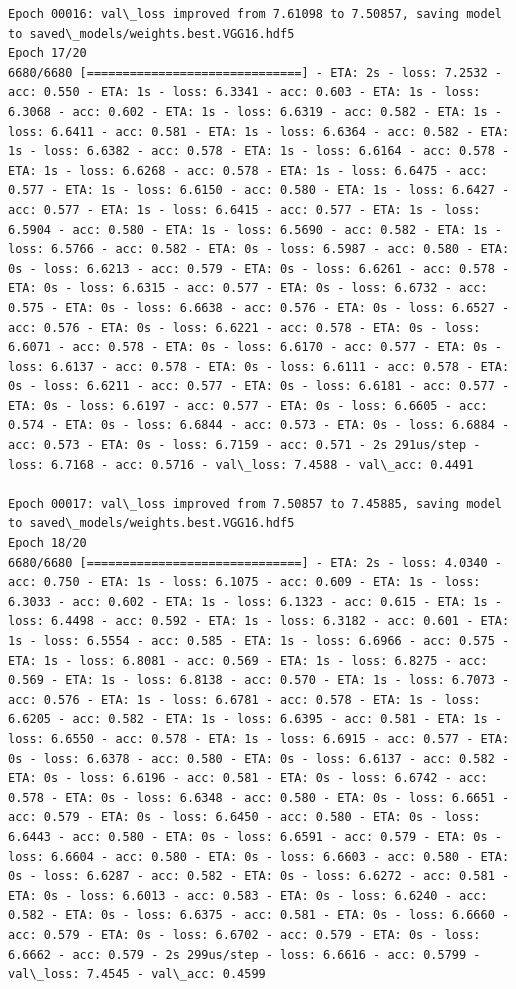 \documentclass[11pt]{article}
\begin{document}
\begin{Verbatim}[commandchars=\\\{\}]
Epoch 00016: val\_loss improved from 7.61098 to 7.50857, saving model to saved\_models/weights.best.VGG16.hdf5
Epoch 17/20
6680/6680 [==============================] - ETA: 2s - loss: 7.2532 - acc: 0.550 - ETA: 1s - loss: 6.3341 - acc: 0.603 - ETA: 1s - loss: 6.3068 - acc: 0.602 - ETA: 1s - loss: 6.6319 - acc: 0.582 - ETA: 1s - loss: 6.6411 - acc: 0.581 - ETA: 1s - loss: 6.6364 - acc: 0.582 - ETA: 1s - loss: 6.6382 - acc: 0.578 - ETA: 1s - loss: 6.6164 - acc: 0.578 - ETA: 1s - loss: 6.6268 - acc: 0.578 - ETA: 1s - loss: 6.6475 - acc: 0.577 - ETA: 1s - loss: 6.6150 - acc: 0.580 - ETA: 1s - loss: 6.6427 - acc: 0.577 - ETA: 1s - loss: 6.6415 - acc: 0.577 - ETA: 1s - loss: 6.5904 - acc: 0.580 - ETA: 1s - loss: 6.5690 - acc: 0.582 - ETA: 1s - loss: 6.5766 - acc: 0.582 - ETA: 0s - loss: 6.5987 - acc: 0.580 - ETA: 0s - loss: 6.6213 - acc: 0.579 - ETA: 0s - loss: 6.6261 - acc: 0.578 - ETA: 0s - loss: 6.6315 - acc: 0.577 - ETA: 0s - loss: 6.6732 - acc: 0.575 - ETA: 0s - loss: 6.6638 - acc: 0.576 - ETA: 0s - loss: 6.6527 - acc: 0.576 - ETA: 0s - loss: 6.6221 - acc: 0.578 - ETA: 0s - loss: 6.6071 - acc: 0.578 - ETA: 0s - loss: 6.6170 - acc: 0.577 - ETA: 0s - loss: 6.6137 - acc: 0.578 - ETA: 0s - loss: 6.6111 - acc: 0.578 - ETA: 0s - loss: 6.6211 - acc: 0.577 - ETA: 0s - loss: 6.6181 - acc: 0.577 - ETA: 0s - loss: 6.6197 - acc: 0.577 - ETA: 0s - loss: 6.6605 - acc: 0.574 - ETA: 0s - loss: 6.6844 - acc: 0.573 - ETA: 0s - loss: 6.6884 - acc: 0.573 - ETA: 0s - loss: 6.7159 - acc: 0.571 - 2s 291us/step - loss: 6.7168 - acc: 0.5716 - val\_loss: 7.4588 - val\_acc: 0.4491

Epoch 00017: val\_loss improved from 7.50857 to 7.45885, saving model to saved\_models/weights.best.VGG16.hdf5
Epoch 18/20
6680/6680 [==============================] - ETA: 2s - loss: 4.0340 - acc: 0.750 - ETA: 1s - loss: 6.1075 - acc: 0.609 - ETA: 1s - loss: 6.3033 - acc: 0.602 - ETA: 1s - loss: 6.1323 - acc: 0.615 - ETA: 1s - loss: 6.4498 - acc: 0.592 - ETA: 1s - loss: 6.3182 - acc: 0.601 - ETA: 1s - loss: 6.5554 - acc: 0.585 - ETA: 1s - loss: 6.6966 - acc: 0.575 - ETA: 1s - loss: 6.8081 - acc: 0.569 - ETA: 1s - loss: 6.8275 - acc: 0.569 - ETA: 1s - loss: 6.8138 - acc: 0.570 - ETA: 1s - loss: 6.7073 - acc: 0.576 - ETA: 1s - loss: 6.6781 - acc: 0.578 - ETA: 1s - loss: 6.6205 - acc: 0.582 - ETA: 1s - loss: 6.6395 - acc: 0.581 - ETA: 1s - loss: 6.6550 - acc: 0.578 - ETA: 1s - loss: 6.6915 - acc: 0.577 - ETA: 0s - loss: 6.6378 - acc: 0.580 - ETA: 0s - loss: 6.6137 - acc: 0.582 - ETA: 0s - loss: 6.6196 - acc: 0.581 - ETA: 0s - loss: 6.6742 - acc: 0.578 - ETA: 0s - loss: 6.6348 - acc: 0.580 - ETA: 0s - loss: 6.6651 - acc: 0.579 - ETA: 0s - loss: 6.6450 - acc: 0.580 - ETA: 0s - loss: 6.6443 - acc: 0.580 - ETA: 0s - loss: 6.6591 - acc: 0.579 - ETA: 0s - loss: 6.6604 - acc: 0.580 - ETA: 0s - loss: 6.6603 - acc: 0.580 - ETA: 0s - loss: 6.6287 - acc: 0.582 - ETA: 0s - loss: 6.6272 - acc: 0.581 - ETA: 0s - loss: 6.6013 - acc: 0.583 - ETA: 0s - loss: 6.6240 - acc: 0.582 - ETA: 0s - loss: 6.6375 - acc: 0.581 - ETA: 0s - loss: 6.6660 - acc: 0.579 - ETA: 0s - loss: 6.6702 - acc: 0.579 - ETA: 0s - loss: 6.6662 - acc: 0.579 - 2s 299us/step - loss: 6.6616 - acc: 0.5799 - val\_loss: 7.4545 - val\_acc: 0.4599


\end{Verbatim}
\end{document}
